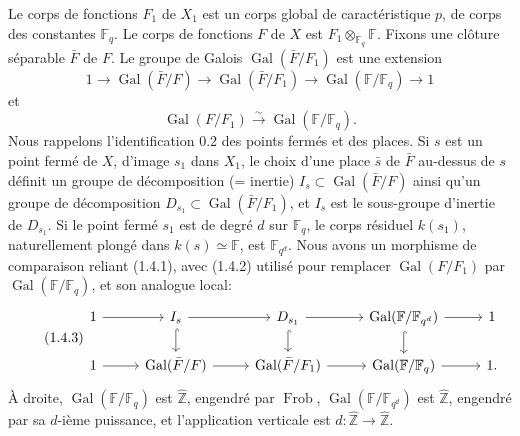 \documentclass[10pt]{article}
\newcommand{\Fq}{\mathbb F_q}
\newcommand{\Fb}{\mathbb F}
\newcommand{\Zhat}{\widehat{\mathbb Z}}
\newcommand{\Gal}{\operatorname{Gal}}
\newcommand{\Frob}{\operatorname{Frob}}
\theoremstyle{deligne}
\begin{document}
Le corps de fonctions $F_1$ de $X_1$ est un corps global de caractéristique $p$, de corps des constantes $\Fq$. Le corps de fonctions $F$ de $X$ est $F_1\otimes_{\Fq}\Fb$. Fixons une clôture séparable $\bar F$ de $F$. Le groupe de Galois $\Gal(\bar F/F_1)$ est une extension
\begin{equation}\tag{1.4.1}
1\longrightarrow \Gal(\bar F/F)\longrightarrow \Gal(\bar F/F_1)
\longrightarrow \Gal(\Fb/\Fq)\longrightarrow 1
\end{equation}
et
\begin{equation}\tag{1.4.2}
\Gal(F/F_1)\overset{\sim}{\longrightarrow}\Gal(\Fb/\Fq).
\end{equation}
Nous rappelons l'identification 0.2 des points fermés et des places. Si $s$ est un point fermé de $X$, d'image $s_1$ dans $X_1$, le choix d'une place $\bar s$ de $\bar F$ au-dessus de $s$ définit un groupe de décomposition (= inertie) $I_s\subset\Gal(\bar F/F)$ ainsi qu'un groupe de décomposition $D_{s_1}\subset\Gal(\bar F/F_1)$, et $I_s$ est le sous-groupe d'inertie de $D_{s_1}$. Si le point fermé $s_1$ est de degré $d$ sur $\Fq$, le corps résiduel $k(s_1)$, naturellement plongé dans $k(s)\simeq\Fb$, est $\mathbb F_{q^d}$. Nous avons un morphisme de comparaison reliant (1.4.1), avec (1.4.2) utilisé pour remplacer $\Gal(F/F_1)$ par $\Gal(\Fb/\Fq)$, et son analogue local:
\begin{equation}\tag{1.4.3}
\begin{tikzcd}[column sep=2.6em,row sep=1.5em]
1 \arrow[r] & I_s \arrow[r] \arrow[d,hook] & D_{s_1} \arrow[r] \arrow[d,hook] & \Gal(\Fb/\mathbb F_{q^d}) \arrow[r] \arrow[d,hook] & 1\\
1 \arrow[r] & \Gal(\bar F/F) \arrow[r] & \Gal(\bar F/F_1) \arrow[r] & \Gal(\Fb/\Fq) \arrow[r] & 1 .
\end{tikzcd}
\end{equation}
À droite, $\Gal(\Fb/\Fq)$ est $\Zhat$, engendré par $\Frob$, $\Gal(\Fb/\mathbb F_{q^d})$ est $\Zhat$, engendré par sa $d$-ième puissance, et l'application verticale est $d:\Zhat\to\Zhat$.
\end{document}
